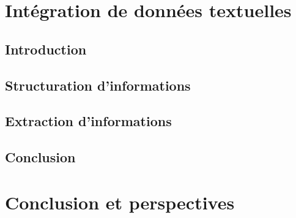 
\part{Intégration de données textuelles}

\chapter{Introduction}


\chapter{Structuration d'informations}


\chapter{Extraction d'informations}


\chapter{Conclusion}



\part{Conclusion et perspectives}


\cleardoublepage    %
\appendix

\clearpage


\printindex
